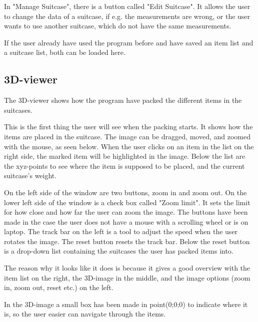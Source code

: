 In "Manage Suitcase", there is a button called "Edit Suitcase". It allows the user to change the data of a suitcase, if e.g. the measurements are wrong, or the user wants to use another suitcase, which do not have the same measurements.

If the user already have used the program before and have saved an item list and a suitcase list, both can be loaded here.

\subsection{3D-viewer}
The 3D-viewer shows how the program have packed the different items in the suitcases.


This is the first thing the user will see when the packing starts. It shows how the items are placed in the suitcase.
The image can be dragged, moved, and zoomed with the mouse, as seen below. When the user clicks on an item in the list on the right side, the marked item will be highlighted in the image. Below the list are the xyz-points to see where the item is supposed to be placed, and the current suitcase's weight. 


On the left side of the window are two buttons, zoom in and zoom out. On the lower left side of the window is a check box called "Zoom limit". It sets the limit for how close and how far the user can zoom the image. The buttons have been made in the case the user does not have a mouse with a scrolling wheel or is on laptop. The track bar on the left is a tool to adjust the speed when the user rotates the image. The reset button resets the track bar. Below the reset button is a drop-down list containing the suitcases the user has packed items into.

The reason why it looks like it does is because it gives a good overview with the item list on the right, the 3D-image in the middle, and the image options (zoom in, zoom out, reset etc.) on the left.

In the 3D-image a small box has been made in point(0;0;0) to indicate where it is, so the user easier can navigate through the items.